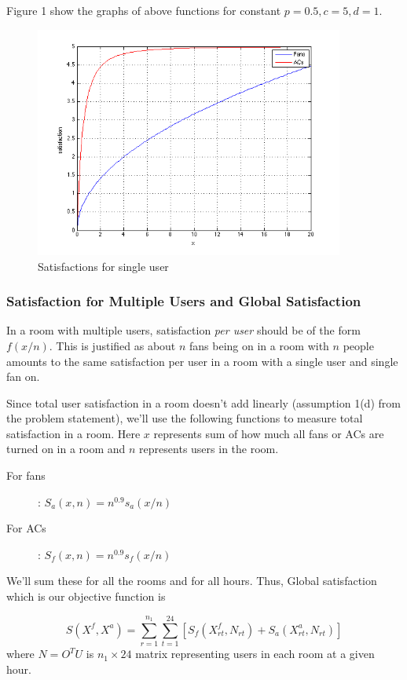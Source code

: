 \documentclass[a4paper]{article}
\begin{document}
Figure 1 show the graphs of above functions for constant $p = 0.5, c = 5, d = 1$.
\begin{figure}[h]
\centering
\includegraphics[width=4in]{cvx_assgn_grph1.png}
\caption{Satisfactions for single user}
\end{figure}

\subsubsection{Satisfaction for Multiple Users and Global Satisfaction}
In a room with multiple users, satisfaction \emph{per user} should be of the form $f(x/n)$.
This is justified as about $n$ fans being on in a room with $n$ people amounts to the same satisfaction per user in a room with a single user and single fan on.

Since total user satisfaction in a room doesn't add linearly (assumption 1(d) from the problem statement), we'll use the following functions to measure total satisfaction in a room. Here $x$ represents sum of how much all fans or ACs are turned on in a room and $n$ represents users in the room.
\begin{description}
\item[For fans]: $S_a(x,n) = n^{0.9}s_a(x/n)$
\item[For ACs]: $S_f(x,n) = n^{0.9}s_f(x/n)$
\end{description}

We'll sum these for all the rooms and for all hours.
Thus, Global satisfaction which is our objective function is

\[
S(X^f,X^a) = \sum_{r = 1}^{n_1} \sum_{t=1}^{24} \left [ S_f(X^f_{rt},N_{rt}) + S_a(X^a_{rt},N_{rt}) \right ]
\]
where $N =  O^TU$ is $n_1 \times 24$ matrix representing users in each room at a given hour.
\end{document}
